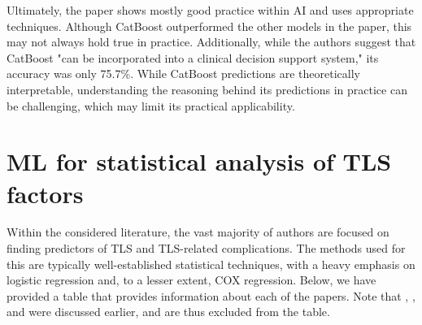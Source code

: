 \documentclass{article}
\begin{document}
Ultimately, the paper shows mostly good practice within AI and uses appropriate techniques.  Although CatBoost outperformed the other models in the paper, this may not always hold true in practice. Additionally, while the authors suggest that CatBoost "can be incorporated into a clinical decision support system," its accuracy was only 75.7\%. While CatBoost predictions are theoretically interpretable, understanding the reasoning behind its predictions in practice can be challenging, which may limit its practical applicability.

\section{ML for statistical analysis of TLS factors}


Within the considered literature, the vast majority of authors are focused on finding predictors of TLS and TLS-related complications. The methods used for this are typically well-established statistical techniques, with a heavy emphasis on logistic regression and, to a lesser extent, COX regression. Below, we have provided a table that provides information about each of the papers. Note that \cite{mato2004predictive}, 
\cite{montesinos2008tumor}, and  \cite{xiao2024prediction} were discussed earlier, and are thus excluded from the table.
\end{document}
